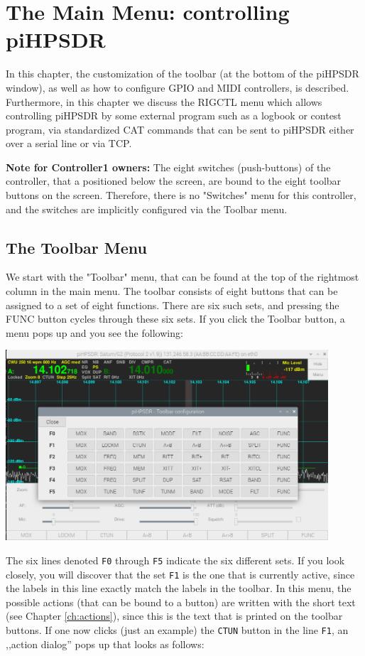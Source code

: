 \documentclass[12pt]{book}
\begin{document}
\chapter{The Main Menu: controlling piHPSDR}

In this chapter, the customization of the toolbar (at the bottom of the piHPSDR window),
as well as how to configure GPIO and MIDI controllers, is described. Furthermore, in this
chapter we discuss the RIGCTL menu which allows controlling piHPSDR by some external program
such as a logbook or contest program, via standardized CAT commands that can be sent to
piHPSDR either over a serial line or via TCP.

\textbf{Note for Controller1 owners:} The eight switches (push-buttons) of the controller,
that a positioned below the screen, are bound to the eight toolbar buttons on the screen.
Therefore, there is no "Switches" menu for this controller, and the switches are implicitly
configured via the Toolbar menu.

\section{The Toolbar Menu}
We start with the "Toolbar" menu, that can be found at the top of the rightmost
column in the main menu. The toolbar consists of eight buttons that can be assigned
to a set of eight functions. There are six such sets, and pressing the FUNC button
cycles through these six sets. If you click the Toolbar button, a menu pops up and
you see the following:

\begin{center}
\includegraphics[width=12cm]{ToolbarMenu1.png}
\end{center}

The six lines denoted \texttt{F0} through \texttt{F5} indicate the six different sets. If you
look closely, you will discover that the set \texttt{F1} is the one that is currently active,
since the labels in this line exactly match the labels in the toolbar. In this menu, the
possible actions (that can be bound to a button) are written with the short text (see Chapter \ref{ch:actions}),
since this is the text that is printed on the toolbar buttons. If one now clicks (just an example)
the \texttt{CTUN} button in the line \texttt{F1}, an ,,action dialog'' pops up that looks as follows:
\end{document}
